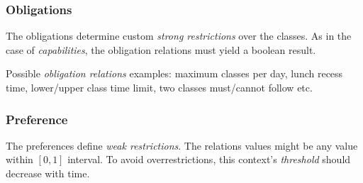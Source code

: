 \subsubsection{Obligations}

The obligations determine custom \emph{strong restrictions} over the classes.
As in the case of \emph{capabilities}, the obligation relations must yield a
boolean result.

Possible \emph{obligation relations} examples: maximum classes per day,
lunch recess time, lower/upper class time limit, two classes must/cannot follow etc.


\subsubsection{Preference}

The preferences define \emph{weak restrictions}. The relations values might be any
value within $[0,1]$ interval. To avoid overrestrictions, this context's \emph{threshold}
should decrease with time.

